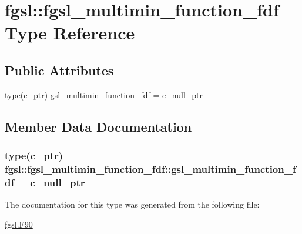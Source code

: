 \hypertarget{structfgsl_1_1fgsl__multimin__function__fdf}{\section{fgsl\-:\-:fgsl\-\_\-multimin\-\_\-function\-\_\-fdf Type Reference}
\label{structfgsl_1_1fgsl__multimin__function__fdf}
}
\subsection*{Public Attributes}
\begin{DoxyCompactItemize}
\item 
type(c\-\_\-ptr) \hyperlink{structfgsl_1_1fgsl__multimin__function__fdf_a08f89b9eb3410dfac2a3d1c75b7073b1}{gsl\-\_\-multimin\-\_\-function\-\_\-fdf} = c\-\_\-null\-\_\-ptr
\end{DoxyCompactItemize}


\subsection{Member Data Documentation}
\hypertarget{structfgsl_1_1fgsl__multimin__function__fdf_a08f89b9eb3410dfac2a3d1c75b7073b1}{
\subsubsection[{gsl\-\_\-multimin\-\_\-function\-\_\-fdf}]{\setlength{\rightskip}{0pt plus 5cm}type(c\-\_\-ptr) fgsl\-::fgsl\-\_\-multimin\-\_\-function\-\_\-fdf\-::gsl\-\_\-multimin\-\_\-function\-\_\-fdf = c\-\_\-null\-\_\-ptr}}\label{structfgsl_1_1fgsl__multimin__function__fdf_a08f89b9eb3410dfac2a3d1c75b7073b1}


The documentation for this type was generated from the following file\-:\begin{DoxyCompactItemize}
\item 
\hyperlink{fgsl_8F90}{fgsl.\-F90}\end{DoxyCompactItemize}
